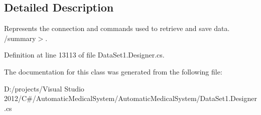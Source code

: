 \subsection{Detailed Description}
Represents the connection and commands used to retrieve and save data. /summary$>$. 

Definition at line 13113 of file DataSet1.Designer.cs.

The documentation for this class was generated from the following file:\begin{CompactItemize}
\item 
D:/projects/Visual Studio 2012/C\#/AutomaticMedicalSystem/AutomaticMedicalSystem/DataSet1.Designer.cs\end{CompactItemize}
